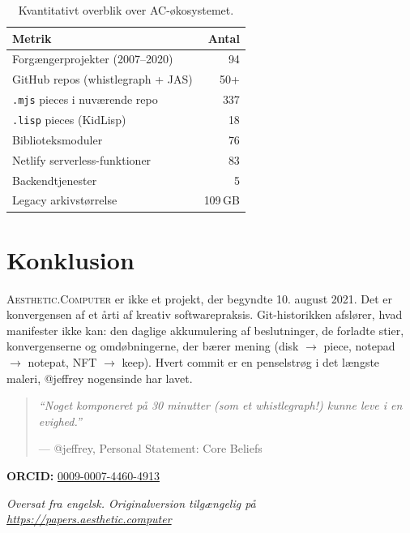 \documentclass[10pt,letterpaper,twocolumn]{article}
\newcommand{\ac}{\textsc{Aesthetic.Computer}}
\begin{document}
\begin{table}[h]
\small\centering
\begin{tabular}{lr}
\toprule
\textbf{Metrik} & \textbf{Antal} \\
\midrule
Forgængerprojekter (2007--2020) & 94 \\
GitHub repos (whistlegraph + JAS) & 50+ \\
\texttt{.mjs} pieces i nuværende repo & 337 \\
\texttt{.lisp} pieces (KidLisp) & 18 \\
Biblioteksmoduler & 76 \\
Netlify serverless-funktioner & 83 \\
Backendtjenester & 5 \\
Legacy arkivstørrelse & 109\,GB \\
\bottomrule
\end{tabular}
\caption{Kvantitativt overblik over AC-økosystemet.}
\end{table}

\section{Konklusion}

\ac{} er ikke et projekt, der begyndte 10. august 2021. Det er konvergensen af et årti af kreativ softwarepraksis. Git-historikken afslører, hvad manifester ikke kan: den daglige akkumulering af beslutninger, de forladte stier, konvergenserne og omdøbningerne, der bærer mening (disk $\rightarrow$ piece, notepad $\rightarrow$ notepat, NFT $\rightarrow$ keep). Hvert commit er en penselstrøg i det længste maleri, @jeffrey nogensinde har lavet.

\begin{quote}
\emph{``Noget komponeret på 30 minutter (som et whistlegraph!) kunne leve i en evighed.''}

--- @jeffrey, Personal Statement: Core Beliefs
\end{quote}

\vspace{0.5em}
\noindent\textbf{ORCID:} \href{https://orcid.org/0009-0007-4460-4913}{0009-0007-4460-4913}

\vspace{0.5em}\noindent\textit{Oversat fra engelsk. Originalversion tilgængelig på \url{https://papers.aesthetic.computer}}



\end{document}
